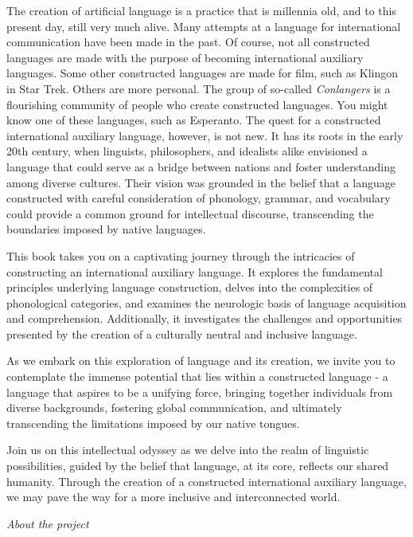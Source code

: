 The creation of artificial language is a practice that is millennia old, and to
this present day, still very much alive. Many attempts at a language for
international communication have been made in the past. Of course, not all
constructed languages are made with the purpose of becoming international
auxiliary languages. Some other constructed languages are made for film, such
as Klingon in Star Trek. Others are more personal. The group of so-called {\it Conlangers} is a flourishing
community of people who create constructed languages. You might know one of
these languages, such as Esperanto. The quest for a constructed international
auxiliary language, however, is not new. It has its roots in the early 20th
century, when linguists, philosophers, and idealists alike envisioned a
language that could serve as a bridge between nations and foster understanding
among diverse cultures. Their vision was grounded in the belief that a language
constructed with careful consideration of phonology, grammar, and vocabulary
could provide a common ground for intellectual discourse, transcending the
boundaries imposed by native languages.


This book takes you on a captivating journey through the intricacies of constructing an international auxiliary language. It explores the fundamental principles underlying language construction, delves into the complexities of phonological categories, and examines the neurologic basis of language acquisition and comprehension. Additionally, it investigates the challenges and opportunities presented by the creation of a culturally neutral and inclusive language. 

As we embark on this exploration of language and its creation, we invite you to contemplate the immense potential that lies within a constructed language - a language that aspires to be a unifying force, bringing together individuals from diverse backgrounds, fostering global communication, and ultimately transcending the limitations imposed by our native tongues. 

Join us on this intellectual odyssey as we delve into the realm of linguistic possibilities, guided by the belief that language, at its core, reflects our shared humanity. Through the creation of a constructed international auxiliary language, we may pave the way for a more inclusive and interconnected world. 

 

    \textit{About the project} 

